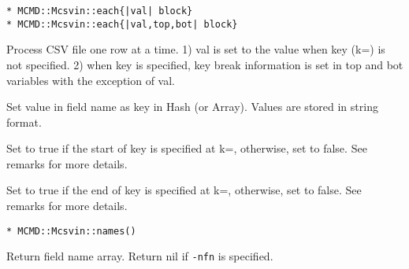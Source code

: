 {\Large
\begin{verbatim}
* MCMD::Mcsvin::each{|val| block}
* MCMD::Mcsvin::each{|val,top,bot| block}
\end{verbatim}
}

Process CSV file one row at a time. 
1) val is set to the value when key (k=) is not specified. 
2) when key is specified, key break information is set in top and bot variables with the exception of val.  

\begin{description}
\setlength{\itemindent}{0mm}
\item[val ] Set value in field name as key in Hash (or Array). Values are stored in string format. 
\item[top ] Set to true if the start of key is specified at k=,  otherwise, set to false. See remarks for more details. 
\item[bot ] Set to true if the end of key is specified at k=, otherwise, set to false. See remarks for more details. 
\end{description}

%

{\Large
\begin{verbatim}
* MCMD::Mcsvin::names()
\end{verbatim}
}

Return field name array. Return nil if \verb|-nfn| is specified. 

